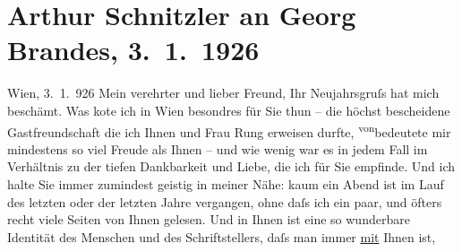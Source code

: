 

               \section[Arthur Schnitzler an Georg Brandes, 3. 1. 1926]{ Arthur Schnitzler an Georg Brandes, 3. 1. 1926}\nopagebreak{}\rehead{ }\begin{ledgroupsized}[t]{13cm}\normalsize\beginnumbering{} \toendnotes[C]{\smallbreak\pagebreak[2]} 
\pstart
           \raggedleft{}{\pb}Wien, 3. 1. 926\pend
           \pstart{}Mein verehrter und lieber Freund,\pend\pstart
           Ihr Neujahrsgruſs hat mich beschämt. Was ko{\geminationn}te ich
                    in Wien besondres für Sie thun – die höchst
                    bescheidene Gastfreundschaft die ich Ihnen und Frau Rung erweisen durfte, \substVorne{}\textsuperscript{von}\substDazwischen{}bedeutete\substHinten{} mir mindestens so viel Freude als Ihnen – und wie wenig war es in jedem
                    Fall im Verhältnis zu der tiefen Dankbarkeit und Liebe, die ich für Sie
                    empfinde. Und ich halte Sie immer zumindest geistig in meiner Nähe: kaum ein
                    Abend ist im Lauf des letzten oder der letzten Jahre vergangen, ohne daſs ich
                    ein paar, und öfters recht viele Seiten von Ihnen gelesen. Und in Ihnen ist eine
                    so wunder{\pb}bare Identität des Menschen und des
                    Schriftstellers, daſs man immer \uline{mit} Ihnen ist,

\end{ledgroupsized}
